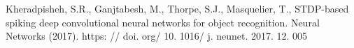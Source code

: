 \documentclass[conference]{IEEEtran}
\begin{document}









\begin{thebibliography}{00}
 Kheradpisheh, S.R., Ganjtabesh, M., Thorpe, S.J., Masquelier, T., STDP-based spiking deep
convolutional neural networks for object recognition. Neural Networks (2017).
https: // doi. org/ 10. 1016/ j. neunet. 2017. 12. 005
\end{thebibliography}
\end{document}
